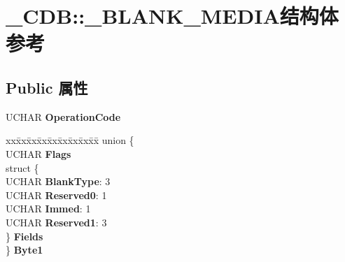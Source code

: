 \hypertarget{struct___c_d_b_1_1___b_l_a_n_k___m_e_d_i_a}{}\section{\+\_\+\+C\+DB\+:\+:\+\_\+\+B\+L\+A\+N\+K\+\_\+\+M\+E\+D\+I\+A结构体 参考}
\label{struct___c_d_b_1_1___b_l_a_n_k___m_e_d_i_a}
\subsection*{Public 属性}
\begin{DoxyCompactItemize}
\item 
\mbox{\label{struct___c_d_b_1_1___b_l_a_n_k___m_e_d_i_a_a5a226b8e4aa44d1fcad9e876948a15de}} 
U\+C\+H\+AR {\bfseries Operation\+Code}
\item 
\mbox{\label{struct___c_d_b_1_1___b_l_a_n_k___m_e_d_i_a_aed5a06bc9b1678cd4e8cb5118bc4966c}} 
\begin{tabbing}
xx\=xx\=xx\=xx\=xx\=xx\=xx\=xx\=xx\=\kill
union \{\\
\>UCHAR {\bfseries Flags}\\
\>struct \{\\
\>\>UCHAR {\bfseries BlankType}: 3\\
\>\>UCHAR {\bfseries Reserved0}: 1\\
\>\>UCHAR {\bfseries Immed}: 1\\
\>\>UCHAR {\bfseries Reserved1}: 3\\
\>\} {\bfseries Fields}\\
\} {\bfseries Byte1}\\


\end{tabbing}
\end{DoxyCompactItemize}

